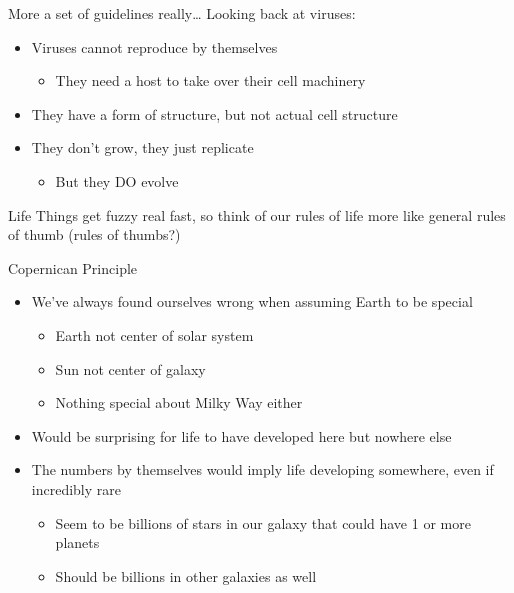 \documentclass[pdf,aspectratio=169]{beamer}
\begin{document}
\begin{frame}{More a set of guidelines really\ldots}
  Looking back at viruses:
  \begin{itemize}
	\item Viruses cannot reproduce by themselves
	  \begin{itemize}
		\item They need a host to take over their cell machinery
	  \end{itemize}
	\item They have a form of structure, but not actual cell structure
	\item They don't grow, they just replicate
	  \begin{itemize}
		\item But they DO evolve
	  \end{itemize}
  \end{itemize}
  \begin{alertblock}{Life}
	Things get fuzzy real fast, so think of our rules of life more like general rules of thumb (rules of thumbs?)
  \end{alertblock}
\end{frame}


\begin{frame}{Copernican Principle}
  \begin{itemize}
	\item We've always found ourselves wrong when assuming Earth to be special
	  \begin{itemize}
		\item Earth not center of solar system
		\item Sun not center of galaxy
		\item Nothing special about Milky Way either
	  \end{itemize}
	\item Would be surprising for life to have developed here but nowhere else
	\item The numbers by themselves would imply life developing somewhere, even if incredibly rare
	  \begin{itemize}
		\item Seem to be billions of stars in our galaxy that could have 1 or more planets
		\item Should be billions in other galaxies as well
	  \end{itemize}
  \end{itemize}
\end{frame}
\end{document}
